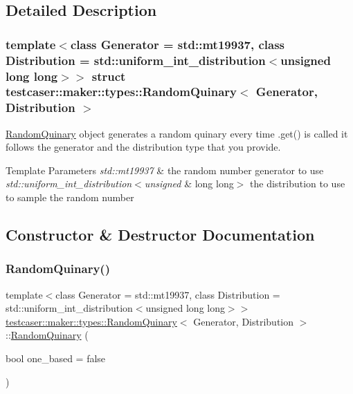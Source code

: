 \subsection{Detailed Description}
\subsubsection*{template$<$class Generator = std\+::mt19937, class Distribution = std\+::uniform\+\_\+int\+\_\+distribution$<$unsigned long long$>$$>$\newline
struct testcaser\+::maker\+::types\+::\+Random\+Quinary$<$ Generator, Distribution $>$}

\mbox{\hyperlink{structtestcaser_1_1maker_1_1types_1_1RandomQuinary}{Random\+Quinary}} object generates a random quinary every time .get() is called it follows the generator and the distribution type that you provide. 


\begin{DoxyTemplParams}{Template Parameters}
{\em std\+::mt19937} & the random number generator to use \\
\hline
{\em std\+::uniform\+\_\+int\+\_\+distribution$<$unsigned} & long long$>$ the distribution to use to sample the random number \\
\hline
\end{DoxyTemplParams}


\subsection{Constructor \& Destructor Documentation}
\mbox{\label{structtestcaser_1_1maker_1_1types_1_1RandomQuinary_ab90bbc3ae63d86dc16de138f9a5a1508}} 
\subsubsection{\texorpdfstring{RandomQuinary()}{RandomQuinary()}}
{\footnotesize\ttfamily template$<$class Generator = std\+::mt19937, class Distribution = std\+::uniform\+\_\+int\+\_\+distribution$<$unsigned long long$>$$>$ \\
\mbox{\hyperlink{structtestcaser_1_1maker_1_1types_1_1RandomQuinary}{testcaser\+::maker\+::types\+::\+Random\+Quinary}}$<$ Generator, Distribution $>$\+::\mbox{\hyperlink{structtestcaser_1_1maker_1_1types_1_1RandomQuinary}{Random\+Quinary}} (\begin{DoxyParamCaption}\item[{bool}]{one\+\_\+based = {\ttfamily false} }\end{DoxyParamCaption})\hspace{0.3cm}{\ttfamily [inline]}}



